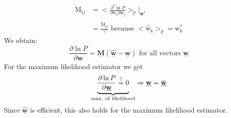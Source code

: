 \begin{equation}
	\begin{array}{ll}
	\mathrm{M}_{ij} 
	& = \Big< \frac{\partial^2 \ln P}{\partial \mathrm{w}_i
		\partial \mathrm{w}_j}	\Big>_p 
		\Big|_{\underline{\mathbf{w}}^*}\\\\
	& = \frac{\mathrm{M}_{ji}}{\gamma} \text{ because } 
		<\hat{\mathrm{w}}_k>_p = \mathrm{w}_k^*
	\end{array}
\end{equation}
We obtain:
\begin{equation}
	\frac{\partial \ln P}{\partial \underline{\mathbf{w}}} 
	= \underline{\mathbf{M}} (\hat{\underline{\mathbf{w}}} 
		- \underline{\mathbf{w}}) \text{ for all vectors }
		\underline{\mathbf{w}}
\end{equation}
For the maximum likelihood estimator we get
\begin{equation}
	\underbrace{ \frac{\partial \ln P}{\partial \underline{\mathbf{w}}} 
		\stackrel{\mathrm{!}}{=} 0}_{\text{max. of likelihood}}
	\Rightarrow \underline{\mathbf{w}} = \hat{\underline{\mathbf{w}}}
\end{equation}
Since $\hat{\underline{\mathbf{w}}}$ is efficient, this also holds for the maximum likelihood estimator.
